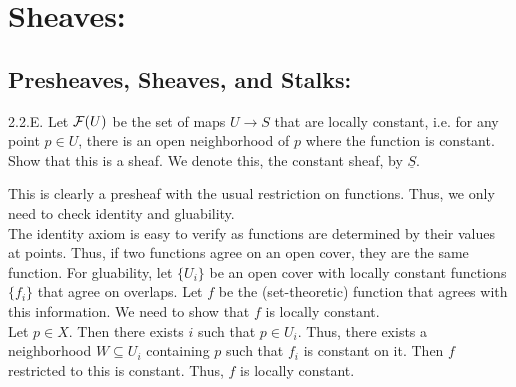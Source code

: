 
\section{Sheaves: }

\subsection{Presheaves, Sheaves, and Stalks:}


\begin{exercise}{2.2.E.} 
    Let $\mathcal{F}(U)$ be the set of maps $U \to S$ that are locally constant, i.e. for any point $p \in U$, there is an open neighborhood of $p$ where the function is constant. Show that this is a sheaf. We denote this, the constant sheaf, by $\underline{S}$.
\end{exercise}
\begin{solution}
    This is clearly a presheaf with the usual restriction on functions. Thus, we only need to check identity and gluability. \\
    The identity axiom is easy to verify as functions are determined by their values at points. Thus, if two functions agree on an open cover, they are the same function. \bbni
    For gluability, let $\{U_i\}$ be an open cover with locally constant functions $\{f_i\}$ that agree on overlaps. Let $f$ be the (set-theoretic) function that agrees with this information. We need to show that $f$ is locally constant. \\
    Let $p \in X$. Then there exists $i$ such that $p \in U_i$. Thus, there exists a neighborhood $W \subseteq U_i$ containing $p$ such that $f_i$ is constant on it. Then $f$ restricted to this is constant. Thus, $f$ is locally constant.
\end{solution}

